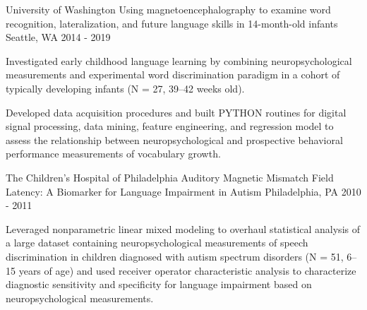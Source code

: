 \begin{cventries}
  \cventry
    {University of Washington} %
    {Using magnetoencephalography to examine word recognition, lateralization, and future language skills in 14-month-old infants} %
    {Seattle, WA} %
    {2014 - 2019} %
    {
      \begin{cvitems} %
        \item {Investigated early childhood language learning by combining neuropsychological measurements and experimental word discrimination paradigm in a cohort of typically developing infants (N = 27, 39–42 weeks old).}
        \item {Developed data acquisition procedures and built PYTHON routines for digital signal processing, data mining, feature engineering, and regression model to assess the relationship between neuropsychological and prospective behavioral performance measurements of vocabulary growth.}
      \end{cvitems}
    }

  \cventry
    {The Children's Hospital of Philadelphia} %
    {Auditory Magnetic Mismatch Field Latency: A Biomarker for Language Impairment in Autism} %
    {Philadelphia, PA} %
    {2010 - 2011} %
    {
      \begin{cvitems} %
        \item {Leveraged nonparametric linear mixed modeling to overhaul statistical analysis of a large dataset containing neuropsychological measurements of speech discrimination in children diagnosed with autism spectrum disorders (N = 51, 6–15 years of age) and used receiver operator characteristic analysis to characterize diagnostic sensitivity and specificity for language impairment based on neuropsychological measurements.}
      \end{cvitems}
    }

\end{cventries}
